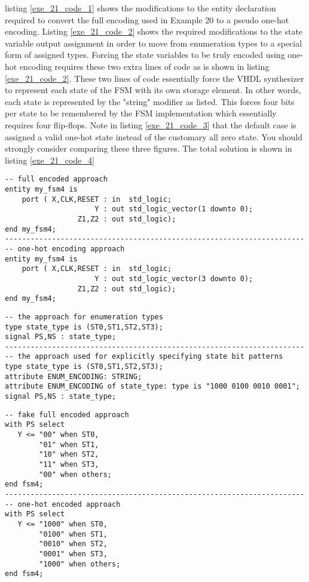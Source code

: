 listing \ref{exe_21_code_1} shows the modifications to the entity declaration required to convert the full encoding used in Example 20 to a pseudo one-hot encoding. Listing \ref{exe_21_code_2} shows the required modifications to the state variable output assignment in order to move from enumeration types to a special form of assigned types. Forcing the state variables to be truly encoded using one-hot encoding requires these two extra lines of code as is shown in listing \ref{exe_21_code_2}. These two lines of code essentially force the VHDL synthesizer to represent each state of the FSM with its own storage element. In other words, each state is represented by the "string" modifier as listed. This forces four bits per state to be remembered by the FSM implementation which essentially requires four flip-flops. Note in listing \ref{exe_21_code_3} that the default case is assigned a valid one-hot state instead of the customary all zero state. You should strongly consider comparing these three figures. The total solution is shown in listing \ref{exe_21_code_4} 

\begin{lstlisting}[label=exe_21_code_1, caption=Modifications to convert Example 20 to one-hot encoding.]
-- full encoded approach
entity my_fsm4 is 
    port ( X,CLK,RESET : in  std_logic; 
                     Y : out std_logic_vector(1 downto 0); 
                 Z1,Z2 : out std_logic);  
end my_fsm4;
----------------------------------------------------------------------
-- one-hot encoding approach
entity my_fsm4 is 
    port ( X,CLK,RESET : in  std_logic; 
                     Y : out std_logic_vector(3 downto 0); 
                 Z1,Z2 : out std_logic);  
end my_fsm4;
\end{lstlisting}

\begin{lstlisting}[label=exe_21_code_2, caption=Modifications to convert state variables to use one-hot encoding.]
-- the approach for enumeration types   
type state_type is (ST0,ST1,ST2,ST3); 
signal PS,NS : state_type; 
----------------------------------------------------------------------
-- the approach used for explicitly specifying state bit patterns
type state_type is (ST0,ST1,ST2,ST3); 
attribute ENUM_ENCODING: STRING; 
attribute ENUM_ENCODING of state_type: type is "1000 0100 0010 0001";
signal PS,NS : state_type;
\end{lstlisting}

\begin{lstlisting}[label=exe_21_code_3, caption=Modifications to convert state output to pseudo one-hot encoding.]
-- fake full encoded approach 
with PS select
   Y <= "00" when ST0, 
        "01" when ST1, 
        "10" when ST2, 
        "11" when ST3, 
        "00" when others; 
end fsm4;
----------------------------------------------------------------------
-- one-hot encoded approach 
with PS select
   Y <= "1000" when ST0, 
        "0100" when ST1, 
        "0010" when ST2, 
        "0001" when ST3, 
        "1000" when others; 
end fsm4;
\end{lstlisting}


